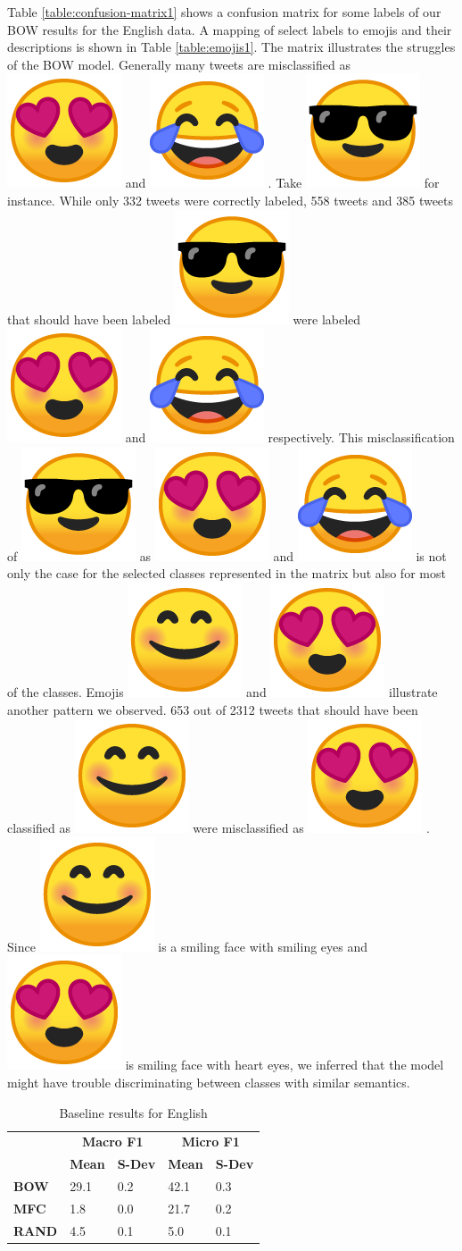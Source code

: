 \documentclass[11pt,a4paper]{article}
\newcommand{\hearteyes}{%
  \begingroup\normalfont
  \includegraphics[height=\fontcharht\font`\B]{emojis/emoji_u1f60d.png}%
  \endgroup
  \space
}
\newcommand{\joytears}{%
  \begingroup\normalfont
  \includegraphics[height=\fontcharht\font`\B]{emojis/emoji_u1f602.png}%
  \endgroup
  \space
}
\newcommand{\smileeyes}{%
  \begingroup\normalfont
  \includegraphics[height=\fontcharht\font`\B]{emojis/emoji_u1f60a.png}%
  \endgroup
  \space
}
\newcommand{\smileshades}{%
  \begingroup\normalfont
  \includegraphics[height=\fontcharht\font`\B]{emojis/emoji_u1f60e.png}%
  \endgroup
  \space
}
\begin{document}
Table \ref{table:confusion-matrix1} shows a confusion matrix for some labels of our BOW results for the English data. A mapping of select labels to emojis and their descriptions is shown in Table \ref{table:emojis1}. The matrix illustrates the struggles of the BOW model.  Generally many tweets are misclassified as \hearteyes and \joytears. Take \smileshades for instance. While only 332 tweets were correctly labeled, 558 tweets and 385 tweets that should have been labeled \smileshades were labeled \hearteyes and \joytears respectively. This misclassification of \smileshades as \hearteyes and \joytears is  not only the case for the selected classes represented in the matrix but also for most of the classes. Emojis \smileeyes and \hearteyes illustrate another pattern we observed. 653 out of 2312 tweets that should have been classified as \smileeyes were misclassified as \hearteyes. Since \smileeyes is a smiling face with smiling eyes and \hearteyes is smiling face with heart eyes, we inferred that the model might have trouble discriminating between classes with similar semantics.

\begin{table}[]
\centering

\begin{tabular}{ r|l|l|l|l| }
\cline{2-5}
 & \multicolumn{2}{c|}{\textbf{Macro F1}} & \multicolumn{2}{c|}{\textbf{Micro F1}} \\ \cline{2-5} 
                                    & \textbf{Mean}     & \textbf{S-Dev}     & \textbf{Mean}     & \textbf{S-Dev}     \\ 
\cline{1-5}
\multicolumn{1}{|l|}{\textbf{BOW}}  & 29.1              & 0.2                & 42.1                & 0.3                 \\ 

\multicolumn{1}{|l|}{\textbf{MFC}}  & 1.8               & 0.0                  & 21.7                & 0.2                 \\
\multicolumn{1}{|l|}{\textbf{RAND}} & 4.5               & 0.1                & 5.0                & 0.1                 \\ \hline
\end{tabular}
\caption{Baseline results for English}
\label{table:baseline-en}
\end{table}
\end{document}
